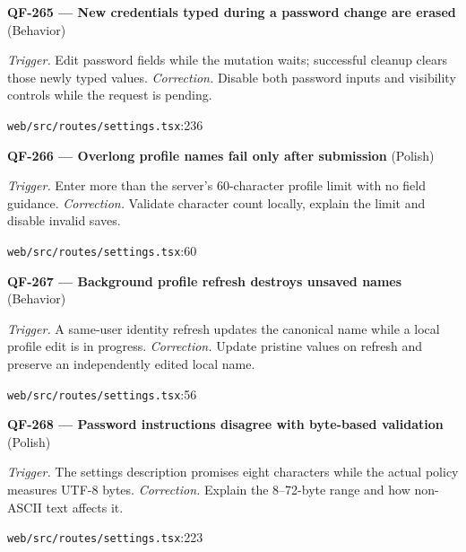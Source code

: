 \begin{minipage}{\linewidth}
\textbf{QF-265 --- New credentials typed during a password change are erased} {\scriptsize\color{accent}(Behavior)}\par
\textit{Trigger.} Edit password fields while the mutation waits; successful cleanup clears those newly typed values. \textit{Correction.} Disable both password inputs and visibility controls while the request is pending.\par
{\scriptsize\color{muted}\nolinkurl{web/src/routes/settings.tsx}:236}\par
\end{minipage}\par\vspace{7pt}
\begin{minipage}{\linewidth}
\textbf{QF-266 --- Overlong profile names fail only after submission} {\scriptsize\color{accent}(Polish)}\par
\textit{Trigger.} Enter more than the server's 60-character profile limit with no field guidance. \textit{Correction.} Validate character count locally, explain the limit and disable invalid saves.\par
{\scriptsize\color{muted}\nolinkurl{web/src/routes/settings.tsx}:60}\par
\end{minipage}\par\vspace{7pt}
\begin{minipage}{\linewidth}
\textbf{QF-267 --- Background profile refresh destroys unsaved names} {\scriptsize\color{accent}(Behavior)}\par
\textit{Trigger.} A same-user identity refresh updates the canonical name while a local profile edit is in progress. \textit{Correction.} Update pristine values on refresh and preserve an independently edited local name.\par
{\scriptsize\color{muted}\nolinkurl{web/src/routes/settings.tsx}:56}\par
\end{minipage}\par\vspace{7pt}
\begin{minipage}{\linewidth}
\textbf{QF-268 --- Password instructions disagree with byte-based validation} {\scriptsize\color{accent}(Polish)}\par
\textit{Trigger.} The settings description promises eight characters while the actual policy measures UTF-8 bytes. \textit{Correction.} Explain the 8–72-byte range and how non-ASCII text affects it.\par
{\scriptsize\color{muted}\nolinkurl{web/src/routes/settings.tsx}:223}\par
\end{minipage}\par\vspace{7pt}
